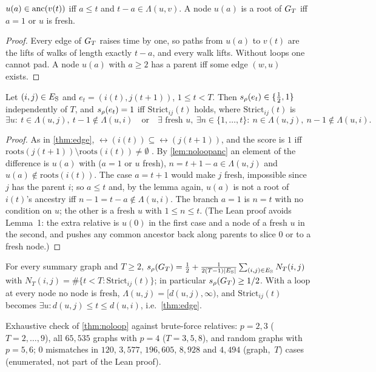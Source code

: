 \begin{lemma}\label{lem:noloopanc}
$u(a)\in\mathrm{anc}(v(t))$ iff $a\le t$ and $t-a\in\Lambda(u,v)$. A node $u(a)$ is a
root of $G_T$ iff $a=1$ or $u$ is fresh.
\end{lemma}
\begin{proof}
Every edge of $G_T$ raises time by one, so paths from $u(a)$ to $v(t)$ are the
lifts of walks of length exactly $t-a$, and every walk lifts. Without loops one
cannot pad. A node $u(a)$ with $a\ge2$ has a parent iff some edge $(w,u)$ exists.
\end{proof}

\begin{theorem}\label{thm:noloop}
Let $(i,j)\in E_{\mathrm S}$ and $e_t=(i(t),j(t{+}1))$, $1\le t<T$. Then
$s_\rho(e_t)\in\{\tfrac12,1\}$ independently of $T$, and $s_\rho(e_t)=1$ iff
$\mathrm{Strict}_{ij}(t)$ holds, where $\mathrm{Strict}_{ij}(t)$ is
\[
\exists u:\ t\in\Lambda(u,j),\ t-1\notin\Lambda(u,i)
\quad\text{or}\quad
\exists\text{ fresh }u,\ \exists n\in\{1,\dots,t\}:\ n\in\Lambda(u,j),\ n-1\notin\Lambda(u,i).
\]
\end{theorem}
\begin{proof}
As in \cref{thm:edge}, $\rel(i(t))\subseteq\rel(j(t{+}1))$, and the score is $1$
iff $\mathrm{roots}(j(t{+}1))\setminus\mathrm{roots}(i(t))\ne\emptyset$
\citep[Thm.~1, Lemma~1]{reisach2026topological}. By \cref{lem:noloopanc} an
element of the difference is $u(a)$ with ($a=1$ or $u$ fresh),
$n=t+1-a\in\Lambda(u,j)$ and $u(a)\notin\mathrm{roots}(i(t))$. The case $a=t+1$
would make $j$ fresh, impossible since $j$ has the parent $i$; so $a\le t$ and,
by the lemma again, $u(a)$ is not a root of $i(t)$'s ancestry iff
$n-1=t-a\notin\Lambda(u,i)$. The branch $a=1$ is $n=t$ with no condition on $u$;
the other is a fresh $u$ with $1\le n\le t$. (The Lean proof avoids Lemma~1: the
extra relative is $u(0)$ in the first case and a node of a fresh $u$ in the
second, and  pushes any common ancestor back along parents
to slice $0$ or to a fresh node.)
\end{proof}

\begin{corollary}\label{cor:noloop}
For every summary graph and $T\ge2$,
$s_\rho(G_T)=\tfrac12+\frac{1}{2(T-1)|E_{\mathrm S}|}\sum_{(i,j)\in E_{\mathrm S}}N_T(i,j)$ with
$N_T(i,j)=\#\{t<T:\mathrm{Strict}_{ij}(t)\}$; in particular $s_\rho(G_T)\ge1/2$.
With a loop at every node no node is fresh, $\Lambda(u,j)=[d(u,j),\infty)$, and
$\mathrm{Strict}_{ij}(t)$ becomes $\exists u:d(u,j)\le t\le d(u,i)$, i.e.\
\cref{thm:edge}.
\end{corollary}
Exhaustive check of \cref{thm:noloop} against brute-force relatives: $p=2,3$
($T=2,\dots,9$), all $65{,}535$ graphs with $p=4$ ($T=3,5,8$), and random graphs
with $p=5,6$; $0$ mismatches in $120$, $3{,}577$, $196{,}605$, $8{,}928$ and
$4{,}494$ (graph,~$T$) cases (enumerated, not part of the Lean proof).

